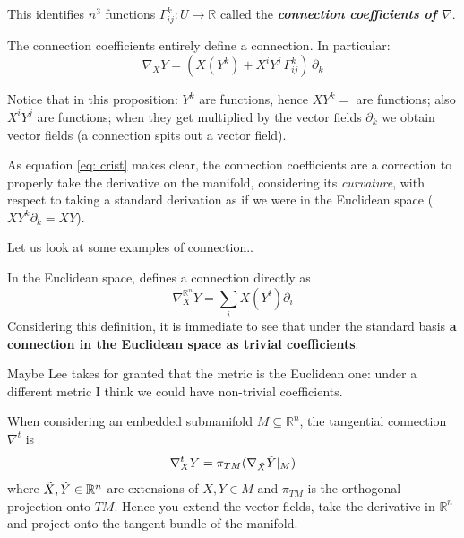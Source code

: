 \documentclass[a4paper,12pt,reqno]{amsbook}
\theoremstyle{definition} %
\newcommand{\1}{\mathbbm{1}}
\newcommand{\R}{\ensuremath{\mathbb{R}}}
\theoremstyle{plain}
\theoremstyle{remark}
\begin{document}
This identifies $n^3$ functions $\Gamma^k_{ij}:U\to \R$ called the \textbf{\emph{connection coefficients of $\nabla$}}.

\begin{proposition}
    The connection coefficients entirely define a connection. In particular:
\begin{equation}\label{eq: crist}
       \nabla_XY=(X(Y^k)+X^iY^j\,\Gamma^k_{ij})\,\partial_k 
\end{equation}

\end{proposition}

Notice that in this proposition: $Y^k$ are functions, hence $XY^k =$ are functions; also $X^iY^j$ are functions; when they get multiplied by the vector fields $\partial_k$ we obtain vector fields (a connection spits out a vector field). 

\begin{remark}
    As equation \ref{eq: crist} makes clear, the connection coefficients are a correction to properly take the derivative on the manifold, considering its \emph{curvature}, with respect to taking a standard derivation as if we were in the Euclidean space ($XY^k\partial_k = XY$). 
\end{remark}

Let us look at some examples of connection.. 

\begin{example}
    In the Euclidean space, \cite{lee2003smooth} defines a connection directly as 
    \[
    \nabla^{\R^n}_X Y = \sum_i X(Y^i)\partial_i
    \]
    Considering this definition, it is immediate to see that under the standard basis \textbf{a connection in the Euclidean space as trivial coefficients}.
\end{example}
Maybe Lee takes for granted that the metric is the Euclidean one: under a different metric I think we could have non-trivial coefficients. 

\begin{example} \label{ex: tgconn}
    When considering an embedded submanifold $M \subseteq \R^n$, the tangential connection $\nabla^t $ is
    \[
    \nabla^t_XY = \pi_{TM}(\nabla_{\Tilde{X}}\Tilde{Y} |_M)
    \]
    where $\Tilde{X}, \Tilde{Y} \in \R^n$ are extensions of $X,Y \in M$ and $\pi_{TM}$ is the orthogonal projection onto $TM$. Hence you extend the vector fields, take the derivative in $\R^n$ and project onto the tangent bundle of the manifold. 
\end{example}
\end{document}
